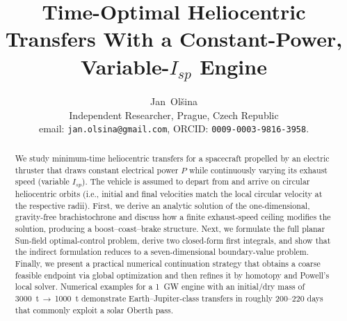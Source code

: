 \documentclass[journal, a4paper]{IEEEtran}
\begin{document}
\title{Time-Optimal Heliocentric Transfers With a Constant-Power, Variable-$I_{\!sp}$ Engine}

\author{Jan~Ol\v{s}ina\\[1ex] Independent Researcher, Prague, Czech Republic\\
email: \texttt{jan.olsina@gmail.com},  ORCID: \texttt{0009-0003-9816-3958}.}


\maketitle

\begin{abstract}
We study minimum-time heliocentric transfers for a spacecraft propelled by an electric thruster that draws constant electrical power $P$ while continuously varying its exhaust speed (variable $I_{\!sp}$). The vehicle is assumed to depart from and arrive on circular heliocentric orbits (i.e., initial and final velocities match the local circular velocity at the respective radii). First, we derive an analytic solution of the one-dimensional, gravity-free brachistochrone and discuss how a finite exhaust-speed ceiling modifies the solution, producing a boost–coast–brake structure. Next, we formulate the full planar Sun-field optimal-control problem, derive two closed-form first integrals, and show that the indirect formulation reduces to a seven-dimensional boundary-value problem. Finally, we present a practical numerical continuation strategy that obtains a coarse feasible endpoint via global optimization and then refines it by homotopy and Powell’s local solver. Numerical examples for a \SI{1}{GW} engine with an initial/dry mass of \SI{3000}{t}\,\(\to\)\,\SI{1000}{t} demonstrate Earth–Jupiter-class transfers in roughly $200$–$220$ days that commonly exploit a solar Oberth pass. 
\end{abstract}
\end{document}
